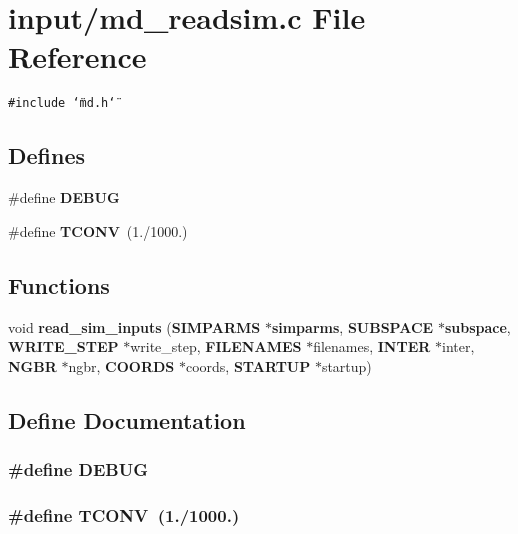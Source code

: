 \section{input/md\_\-readsim.c File Reference}
\label{input_2md__readsim_8c}
{\tt \#include \char`\"{}md.h\char`\"{}}\par
\subsection*{Defines}
\begin{CompactItemize}
\item 
\#define {\bf DEBUG}
\item 
\#define {\bf TCONV}~(1./1000.)
\end{CompactItemize}
\subsection*{Functions}
\begin{CompactItemize}
\item 
void {\bf read\_\-sim\_\-inputs} ({\bf SIMPARMS} $\ast${\bf simparms}, {\bf SUBSPACE} $\ast${\bf subspace}, {\bf WRITE\_\-STEP} $\ast$write\_\-step, {\bf FILENAMES} $\ast$filenames, {\bf INTER} $\ast$inter, {\bf NGBR} $\ast$ngbr, {\bf COORDS} $\ast$coords, {\bf STARTUP} $\ast$startup)
\end{CompactItemize}


\subsection{Define Documentation}
\subsubsection{\setlength{\rightskip}{0pt plus 5cm}\#define DEBUG}\label{input_2md__readsim_8c_d72dbcf6d0153db1b8d8a58001feed83}


\subsubsection{\setlength{\rightskip}{0pt plus 5cm}\#define TCONV~(1./1000.)}\label{input_2md__readsim_8c_5e7494ae7535ea1a69379cc3faef9ae2}




